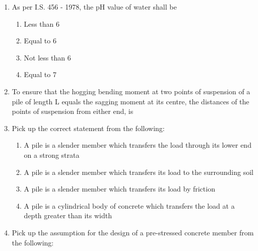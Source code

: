 \documentclass[11pt,a4paper]{article}
\begin{document}
\begin{enumerate}
\\
\item{As per I.S. 456 - 1978, the pH value of water shall be}
\begin{enumerate}[label=\Alph*.]
\item{Less than 6}
\item{Equal to 6}
\item{Not less than 6}
\item{Equal to 7}
\end{enumerate}
\item{To ensure that the hogging bending moment at two points of suspension of a pile of length L equals the sagging moment at its centre, the distances of the points of suspension from either end, is}
\\
\item{Pick up the correct statement from the following:}
\begin{enumerate}[label=\Alph*.]
\item{A pile is a slender member which transfers the load through its lower end on a strong strata}
\item{A pile is a slender member which transfers its load to the surrounding soil}
\item{A pile is a slender member which transfers its load by friction}
\item{A pile is a cylindrical body of concrete which transfers the load at a depth greater than its width}
\end{enumerate}
\item{Pick up the assumption for the design of a pre-stressed concrete member from the following:}

\end{enumerate}
\end{document}
